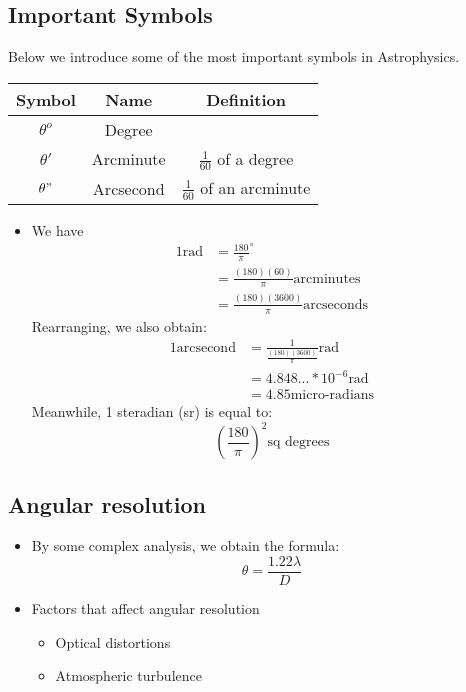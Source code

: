 \documentclass{article}
\begin{document}
\subsection{Important Symbols}
Below we introduce some of the most important symbols in Astrophysics.
\begin{table}[h]
  \begin{center}
    \begin{tabular}{c|c|c}
      \textbf{Symbol} & \textbf{Name}&\textbf{Definition}\\
      \hline
      $\theta^o$ & Degree &\\
      $\theta'$ & Arcminute & $\frac{1}{60}$ of a degree\\
      $\theta"$ & Arcsecond & $\frac{1}{60}$ of an arcminute
      \end{tabular}
  \end{center}
\end{table}
\begin{itemize}
\item We have 
\begin{align}
1\text{rad}&= {\frac{180}{\pi}}^{\circ}\\
&= {\frac{(180)(60)}{\pi}} \text{arcminutes}\\
&={\frac{(180)(3600)}{\pi}} \text{arcseconds}
\end{align}
Rearranging, we also obtain:
\begin{align}
1 \text{arcsecond}&=\frac{1}{\frac{(180)(3600)}{\pi}} \text{rad}\\
&=4.848...*10^{-6}\text{rad}\\
&=4.85  \text{micro-radians}
\end{align}
Meanwhile, 1 steradian (sr) is equal to:
\begin{equation}
\left(\frac{180}{\pi} \right)^2 \text{sq degrees}
\end{equation}
\end{itemize}
\subsection{Angular resolution}
\begin{itemize}
\item By some complex analysis, we obtain the formula:
\begin{equation}
\theta=\frac{1.22 \lambda}{D}
\end{equation}
\item Factors that affect angular resolution
\begin{itemize}
\item Optical distortions
\item Atmospheric turbulence
\end{itemize}
\end{itemize}
\end{document}
